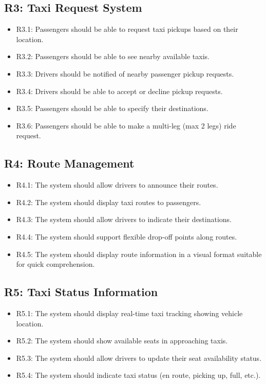 \documentclass[a4paper,12pt]{article}
\begin{document}
\subsection*{R3: Taxi Request System}
\begin{itemize}
    \item R3.1: Passengers should be able to request taxi pickups based on their location.
    \item R3.2: Passengers should be able to see nearby available taxis.
    \item R3.3: Drivers should be notified of nearby passenger pickup requests.
    \item R3.4: Drivers should be able to accept or decline pickup requests.
    \item R3.5: Passengers should be able to specify their destinations.
    \item R3.6: Passengers should be able to make a multi-leg (max 2 legs) ride request.
\end{itemize}

\subsection*{R4: Route Management}
\begin{itemize}
    \item R4.1: The system should allow drivers to announce their routes.
    \item R4.2: The system should display taxi routes to passengers.
    \item R4.3: The system should allow drivers to indicate their destinations.
    \item R4.4: The system should support flexible drop-off points along routes.
    \item R4.5: The system should display route information in a visual format suitable for quick comprehension.
\end{itemize}

\subsection*{R5: Taxi Status Information}
\begin{itemize}
    \item R5.1: The system should display real-time taxi tracking showing vehicle location.
    \item R5.2: The system should show available seats in approaching taxis.
    \item R5.3: The system should allow drivers to update their seat availability status.
    \item R5.4: The system should indicate taxi status (en route, picking up, full, etc.).
\end{itemize}
\end{document}

